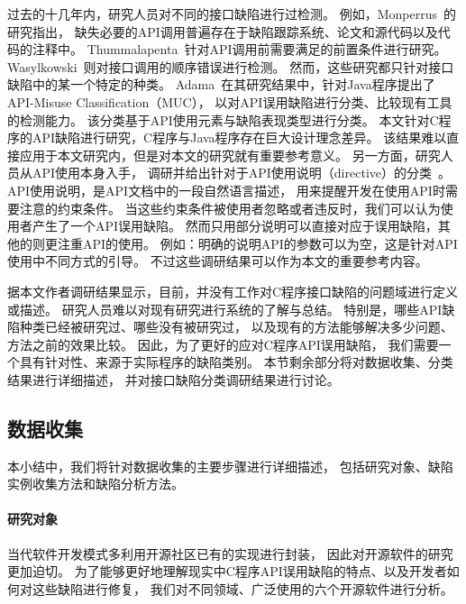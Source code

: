过去的十几年内，研究人员对不同的接口缺陷进行过检测。
例如，Monperrus~\cite{13-tosem-missing-call}的研究指出，
缺失必要的API调用普遍存在于缺陷跟踪系统、论文和源代码以及代码的注释中。
Thummalapenta~\cite{09-icse-exception}针对API调用前需要满足的前置条件进行研究。
Wasylkowski~\cite{07-fse-object}则对接口调用的顺序错误进行检测。
然而，这些研究都只针对接口缺陷中的某一个特定的种类。
Adama~\cite{survey18}在其研究结果中，针对Java程序提出了API-Misuse Classification（MUC），
以对API误用缺陷进行分类、比较现有工具的检测能力。
该分类基于API使用元素与缺陷表现类型进行分类。
本文针对C程序的API缺陷进行研究，C程序与Java程序存在巨大设计理念差异。
该结果难以直接应用于本文研究内，但是对本文的研究就有重要参考意义。
另一方面，研究人员从API使用本身入手，
调研并给出针对于API使用说明（directive）的分类~\cite{09-icse-doc,12-ese-directive}。
API使用说明，是API文档中的一段自然语言描述，
用来提醒开发在使用API时需要注意的约束条件。
当这些约束条件被使用者忽略或者违反时，我们可以认为使用者产生了一个API误用缺陷。
然而只用部分说明可以直接对应于误用缺陷，其他的则更注重API的使用。
例如：明确的说明API的参数可以为空，这是针对API使用中不同方式的引导。
不过这些调研结果可以作为本文的重要参考内容。


据本文作者调研结果显示，目前，并没有工作对C程序接口缺陷的问题域进行定义或描述。
研究人员难以对现有研究进行系统的了解与总结。
特别是，哪些API缺陷种类已经被研究过、哪些没有被研究过，
以及现有的方法能够解决多少问题、方法之前的效果比较。
因此，为了更好的应对C程序API误用缺陷，
我们需要一个具有针对性、来源于实际程序的缺陷类别。
本节剩余部分将对数据收集、分类结果进行详细描述，
并对接口缺陷分类调研结果进行讨论。

\subsection{数据收集}
本小结中，我们将针对数据收集的主要步骤进行详细描述，
包括研究对象、缺陷实例收集方法和缺陷分析方法。

\paragraph{研究对象}


当代软件开发模式多利用开源社区已有的实现进行封装，
因此对开源软件的研究更加迫切。
为了能够更好地理解现实中C程序API误用缺陷的特点、以及开发者如何对这些缺陷进行修复，
我们对不同领域、广泛使用的六个开源软件进行分析。

